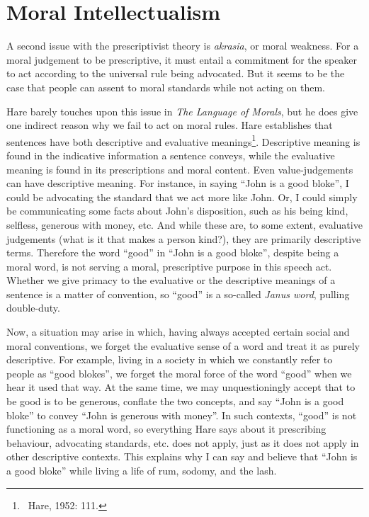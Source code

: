 \documentclass[12pt]{article}
\begin{document}
\section{Moral Intellectualism}

A second issue with the prescriptivist theory is \textit{akrasia}, or moral weakness. For a moral judgement to be prescriptive, it must entail a commitment for the speaker to act according to the universal rule being advocated. But it seems to be the case that people can assent to moral standards while not acting on them.

Hare barely touches upon this issue in \textit{The Language of Morals}, but he does give one indirect reason why we fail to act on moral rules. Hare establishes that sentences have both descriptive and evaluative meanings\footnote{~Hare, 1952: 111.}. Descriptive meaning is found in the indicative information a sentence conveys, while the evaluative meaning is found in its prescriptions and moral content. Even value-judgements can have descriptive meaning. For instance, in saying ``John is a good bloke'', I could be advocating the standard that we act more like John. Or, I could simply be communicating some facts about John's disposition, such as his being kind, selfless, generous with money, etc. And while these are, to some extent, evaluative judgements (what is it that makes a person kind?), they are primarily descriptive terms. Therefore the word ``good'' in ``John is a good bloke'', despite being a moral word, is not serving a moral, prescriptive purpose in this speech act. Whether we give primacy to the evaluative or the descriptive meanings of a sentence is a matter of convention, so ``good'' is a so-called \textit{Janus word}, pulling double-duty.

Now, a situation may arise in which, having always accepted certain social and moral conventions, we forget the evaluative sense of a word and treat it as purely descriptive. For example, living in a society in which we constantly refer to people as ``good blokes'', we forget the moral force of the word ``good'' when we hear it used that way. At the same time, we may unquestioningly accept that to be good is to be generous, conflate the two concepts, and say ``John is a good bloke'' to convey ``John is generous with money''. In such contexts, ``good'' is not functioning as a moral word, so everything Hare says about it prescribing behaviour, advocating standards, etc. does not apply, just as it does not apply in other descriptive contexts. This explains why I can say and believe that ``John is a good bloke'' while living a life of rum, sodomy, and the lash.
\end{document}
